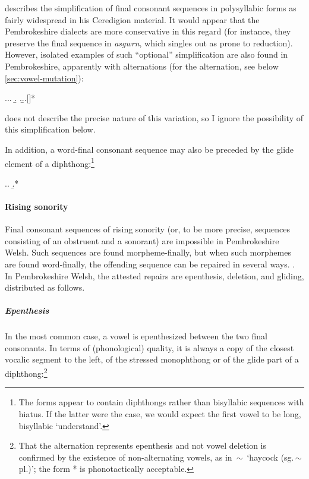 \citet[pp.~87--94]{wmffre03:_languag_wales} describes the simplification of final consonant sequences in polysyllabic forms as fairly widespread in his Ceredigion material. It would appear that the Pembrokeshire dialects are more conservative in this regard (for instance, they preserve the final sequence in \emph{asgwrn}, which \citeauthor{wmffre03:_languag_wales} \cite*{wmffre03:_languag_wales} singles out as prone to reduction). However, isolated examples of such \enquote{optional} simplification are also found in Pembrokeshire, apparently with alternations (for the \alternation{[u]}{[ə]} alternation, see below \cref{sec:vowel-mutation}):

\ex.\a.\a.
\b.\mbi{[ˈsaːdun]}
\z.\b.\a.[]*

\citet{awbery86:_pembr_welsh} does not describe the precise nature of this variation, so I ignore the possibility of this simplification below.

In addition, a word-final consonant sequence may also be preceded by the glide element of a diphthong:\footnote{The forms appear to contain diphthongs rather than bisyllabic sequences with hiatus. If the latter were the case, we would expect the first vowel to be long, \cf bisyllabic \ipa{[ˈdeːaɬ]} `understand'.}

\ex.\a.
\b.*

\paragraph{Rising sonority}
\label{sec:rising-sonority}

Final consonant sequences of rising sonority (or, to be more precise, sequences consisting of an obstruent and a sonorant) are impossible in Pembrokeshire Welsh. Such sequences are found morpheme-finally, but when such morphemes are found word-finally, the offending sequence can be repaired in several ways. \citep{welshphonotactics,awbery86:_pembr_welsh,hannahs09:_welsh}. In Pembrokeshire Welsh, the attested repairs are epenthesis, deletion, and gliding, distributed as follows.

\subparagraph{Epenthesis}
\label{sec:epenthesis}

In the most common case, a vowel is epenthesized between the two final consonants. In terms of (phonological) quality, it is always a copy of the closest vocalic segment to the left, \ie of the stressed monophthong or of the glide part of a diphthong:\footnote{That the alternation represents epenthesis and not vowel deletion is confirmed by the existence of non-alternating vowels, as in \ipa{[ˈmuːdul]}\,$\sim$\,\ipa{[muˈduːle]} `haycock (sg.\,$\sim$\,pl.)'; the form *\ipa{[ˈmʊdle]} is phonotactically acceptable.}

